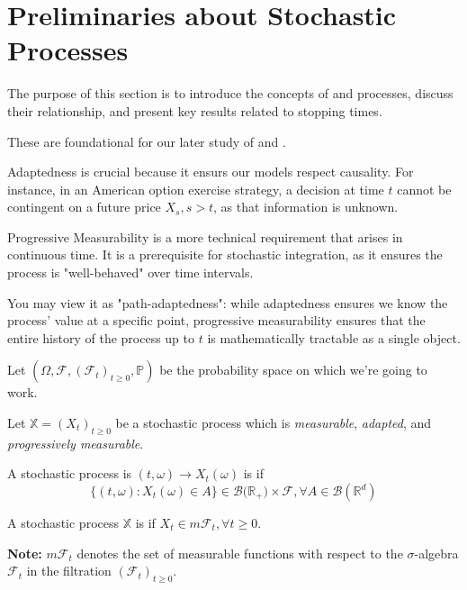 
\section{Preliminaries about Stochastic Processes}

\begin{intermission}
    The purpose of this section is to introduce the concepts of  and  processes, 
    discuss their relationship, and present key results related to stopping times. 
    
    These are foundational for our later study of  
    and .
    
    Adaptedness is crucial because it ensurs our models respect causality. 
    For instance, in an American option exercise strategy, a decision at 
    time $t$ cannot be contingent on a future price $X_{s}, s > t$, as 
    that information is unknown. 

    Progressive Measurability is a more technical requirement that 
    arises in continuous time. It is a prerequisite for stochastic 
    integration, as it ensures the process is "well-behaved" over time intervals.

    You may view it as "path-adaptedness": while adaptedness ensures 
    we know the process' value at a specific point, progressive 
    measurability ensures that the entire history of the process up to $t$
    is mathematically tractable as a single object.

\end{intermission}

Let $(\Omega, \mathcal{F}, (\mathcal{F}_{t})_{t \geq 0}, \mathbb{P})$ be the probability space on which we're going to work. 


Let $\mathbb{X}=(X_t)_{t \geq 0}$ be a stochastic process which is \textit{measurable}, \textit{adapted}, and \textit{progressively measurable}.

\begin{definition}
A stochastic process is $(t,\omega) \to X_t(\omega)$ is  if $$\{(t, \omega): X_t(\omega) \in A\} \in \mathcal{B}(\mathbb{R_+)} \times \mathcal{F}, \forall A \in \mathcal{B}(\mathbb{R}^d)$$
\end{definition}

\begin{definition}
    A stochastic process $\mathbb{X}$ is  if $X_t \in m\mathcal{F}_t, \forall t \geq 0$.

    \textbf{Note:} $m\mathcal{F}_t$ denotes the set of measurable functions with respect to the $\sigma$-algebra $\mathcal{F}_{t}$ in the filtration $(\mathcal{F}_{t})_{t\geq0}$.
\end{definition}

